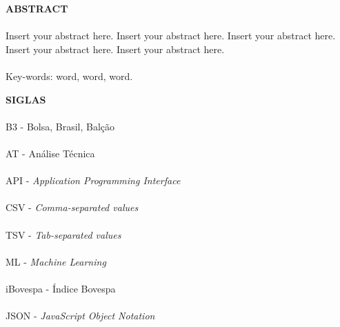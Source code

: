 \pagebreak


\begin{center}
\textbf{ABSTRACT}
\end{center}
      \vspace{0.5cm}

\paragraph{}Insert your abstract here. Insert your abstract here. Insert your abstract here. Insert your abstract here. Insert your abstract here.
\paragraph{}
\noindent Key-words: word, word, word.

\pagebreak


\begin{center}
\textbf{SIGLAS}
\end{center}
      \vspace{0.5cm}

\paragraph{}B3 - Bolsa, Brasil, Balção
\paragraph{}AT - Análise Técnica
\paragraph{}API - \textit{Application Programming Interface}
\paragraph{}CSV - \textit{Comma-separated values}
\paragraph{}TSV - \textit{Tab-separated values}
\paragraph{}ML - \textit{Machine Learning}
\paragraph{}iBovespa - Índice Bovespa
\paragraph{}JSON - \textit{JavaScript Object Notation}


\pagebreak